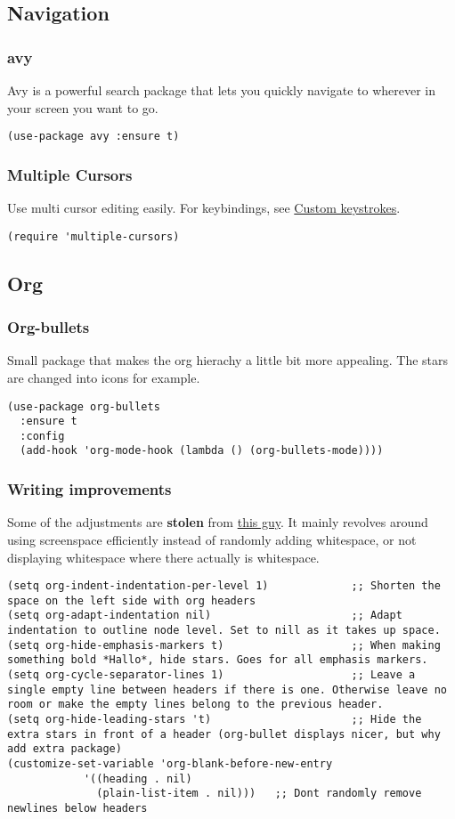 \documentclass[11pt]{article}
\begin{document}
\subsection{Navigation}
\label{sec:orgf4a1eed}
\subsubsection{avy}
\label{sec:orgb4de0b0}
Avy is a powerful search package that lets you quickly navigate to wherever in your screen you want to go.
\begin{verbatim}
(use-package avy :ensure t)
\end{verbatim}
\subsubsection{Multiple Cursors}
\label{sec:org2f6ff37}
Use multi cursor editing easily. For keybindings, see \hyperref[sec:org63af768]{Custom keystrokes}.
\begin{verbatim}
(require 'multiple-cursors)
\end{verbatim}
\subsection{Org}
\label{sec:orgca23b88}
\subsubsection{Org-bullets}
\label{sec:org4ac6f15}
Small package that makes the org hierachy a little bit more appealing. The stars are changed into icons for example.
\begin{verbatim}
(use-package org-bullets
  :ensure t
  :config
  (add-hook 'org-mode-hook (lambda () (org-bullets-mode))))
\end{verbatim}
\subsubsection{Writing improvements}
\label{sec:org7df5f63}
Some of the adjustments are \textbf{stolen} from \href{https://explog.in/notes/writingsetup.html}{this guy}. It mainly revolves around using screenspace efficiently instead of randomly adding whitespace, or not displaying whitespace where there actually is whitespace.
\begin{verbatim}
(setq org-indent-indentation-per-level 1)             ;; Shorten the space on the left side with org headers
(setq org-adapt-indentation nil)                      ;; Adapt indentation to outline node level. Set to nill as it takes up space.
(setq org-hide-emphasis-markers t)                    ;; When making something bold *Hallo*, hide stars. Goes for all emphasis markers.
(setq org-cycle-separator-lines 1)                    ;; Leave a single empty line between headers if there is one. Otherwise leave no room or make the empty lines belong to the previous header.
(setq org-hide-leading-stars 't)                      ;; Hide the extra stars in front of a header (org-bullet displays nicer, but why add extra package)
(customize-set-variable 'org-blank-before-new-entry 
			'((heading . nil)
			  (plain-list-item . nil)))   ;; Dont randomly remove newlines below headers
\end{verbatim}
\end{document}

